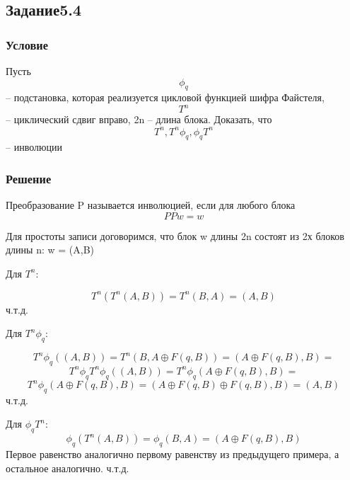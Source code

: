 \documentclass[10pt,a4paper]{article}
\begin{document}
\subsection*{Задание5.4}
\subsubsection*{Условие}
Пусть $$ \phi_q $$ -- подстановка, которая реализуется цикловой функцией
шифра Файстеля, $$ T^n $$-- циклический сдвиг вправо, 2n -- длина
блока. Доказать, что $$ T^n, T^n \phi_q, \phi_q T^n $$-- инволюции
\subsubsection*{Решение}
Преобразование P называется инволюцией, если для любого блока
$$ PPw = w $$

Для простоты записи договоримся, что блок w длины 2n состоят из 2х
блоков длины n: w = (A,B)

Для $ T^n $: 

$$ T^n(T^n(A,B)) = T^n(B,A) = (A,B) $$ ч.т.д.

Для $ T^n \phi_q $:

$$ T^n \phi_q((A,B)) = T^n(B, A ⊕ F(q, B)) = (A ⊕ F(q, B), B) = $$
$$ T^n \phi_q T^n \phi_q((A,B)) = T^n \phi_q (A ⊕ F(q, B), B) = $$
$$ T^n \phi_q (A ⊕ F(q, B), B) = (A ⊕ F(q, B) ⊕ F(q, B), B) = (A,B) $$ ч.т.д.

Для $ \phi_q T^n $:
$$ \phi_q(T^n(A,B)) = \phi_q(B, A) = (A ⊕ F(q, B), B) $$
Первое равенство аналогично первому равенству из предыдущего примера,
а остальное аналогично. ч.т.д.
\end{document}
